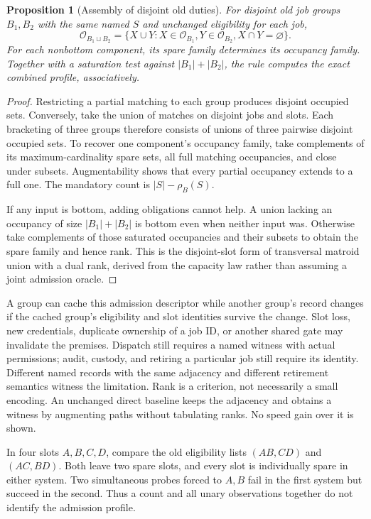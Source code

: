 \documentclass[11pt]{article}
\newtheorem{proposition}{Proposition}
\begin{document}
\begin{proposition}[Assembly of disjoint old duties]
For disjoint old job groups $B_1,B_2$ with the same named $S$ and unchanged eligibility for each job,
\[
 \mathcal O_{B_1\sqcup B_2}
   =\{X\cup Y:X\in\mathcal O_{B_1},Y\in\mathcal O_{B_2}, X\cap Y=\varnothing\}.
\]
For each nonbottom component, its spare family determines its occupancy family. Together with a saturation test against $|B_1|+|B_2|$, the rule computes the exact combined profile, associatively.
\end{proposition}
\begin{proof}
Restricting a partial matching to each group produces disjoint occupied sets. Conversely, take the union of matches on disjoint jobs and slots. Each bracketing of three groups therefore consists of unions of three pairwise disjoint occupied sets. To recover one component's occupancy family, take complements of its maximum-cardinality spare sets, all full matching occupancies, and close under subsets. Augmentability shows that every partial occupancy extends to a full one. The mandatory count is $|S|-\rho_B(S)$.

If any input is bottom, adding obligations cannot help. A union lacking an occupancy of size $|B_1|+|B_2|$ is bottom even when neither input was. Otherwise take complements of those saturated occupancies and their subsets to obtain the spare family and hence rank. This is the disjoint-slot form of transversal matroid union with a dual rank, derived from the capacity law rather than assuming a joint admission oracle.
\end{proof}

A group can cache this admission descriptor while another group's record changes if the cached group's eligibility and slot identities survive the change. Slot loss, new credentials, duplicate ownership of a job ID, or another shared gate may invalidate the premises. Dispatch still requires a named witness with actual permissions; audit, custody, and retiring a particular job still require its identity. Different named records with the same adjacency and different retirement semantics witness the limitation. Rank is a criterion, not necessarily a small encoding. An unchanged direct baseline keeps the adjacency and obtains a witness by augmenting paths without tabulating ranks. No speed gain over it is shown.

In four slots $A,B,C,D$, compare the old eligibility lists $(AB,CD)$ and $(AC,BD)$. Both leave two spare slots, and every slot is individually spare in either system. Two simultaneous probes forced to $A,B$ fail in the first system but succeed in the second. Thus a count and all unary observations together do not identify the admission profile.
\end{document}

